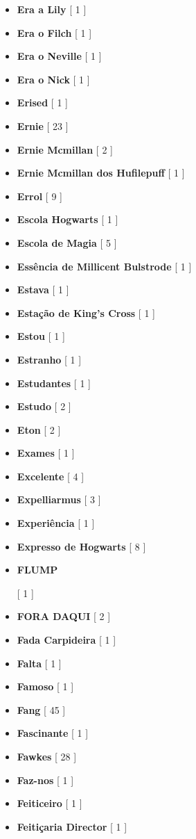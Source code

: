 \documentclass[a4paper]{article}
\begin{document}
{\begin{itemize}
	\item \textbf{Era a Lily} [ 1 ]
	\item \textbf{Era o Filch} [ 1 ]
	\item \textbf{Era o Neville} [ 1 ]
	\item \textbf{Era o Nick} [ 1 ]
	\item \textbf{Erised} [ 1 ]
	\item \textbf{Ernie} [ 23 ]
	\item \textbf{Ernie Mcmillan} [ 2 ]
	\item \textbf{Ernie Mcmillan dos Hufilepuff} [ 1 ]
	\item \textbf{Errol} [ 9 ]
	\item \textbf{Escola Hogwarts} [ 1 ]
	\item \textbf{Escola de Magia} [ 5 ]
	\item \textbf{Essência de Millicent Bulstrode} [ 1 ]
	\item \textbf{Estava} [ 1 ]
	\item \textbf{Estação de King's Cross} [ 1 ]
	\item \textbf{Estou} [ 1 ]
	\item \textbf{Estranho} [ 1 ]
	\item \textbf{Estudantes} [ 1 ]
	\item \textbf{Estudo} [ 2 ]
	\item \textbf{Eton} [ 2 ]
	\item \textbf{Exames} [ 1 ]
	\item \textbf{Excelente} [ 4 ]
	\item \textbf{Expelliarmus} [ 3 ]
	\item \textbf{Experiência} [ 1 ]
	\item \textbf{Expresso de Hogwarts} [ 8 ]
	\item \hypertarget{F}{\textbf{FLUMP}} [ 1 ]
	\item \textbf{FORA DAQUI} [ 2 ]
	\item \textbf{Fada Carpideira} [ 1 ]
	\item \textbf{Falta} [ 1 ]
	\item \textbf{Famoso} [ 1 ]
	\item \textbf{Fang} [ 45 ]
	\item \textbf{Fascinante} [ 1 ]
	\item \textbf{Fawkes} [ 28 ]
	\item \textbf{Faz-nos} [ 1 ]
	\item \textbf{Feiticeiro} [ 1 ]
	\item \textbf{Feitiçaria Director} [ 1 ]

\end{itemize}}
\end{document}
